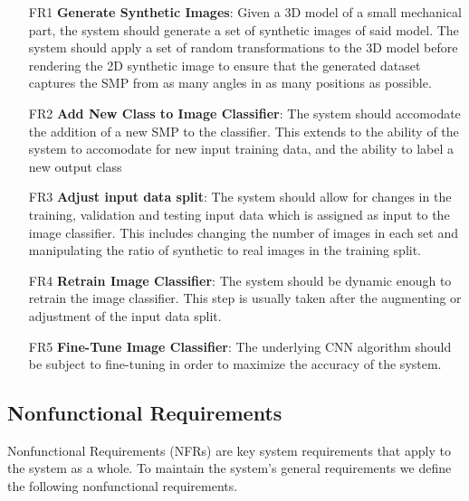 \documentclass[a4paper,12pt,twoside]{report}
\begin{document}
\begin{itemize}
\item [FR1] \textbf{Generate Synthetic Images}: Given a 3D model of a small mechanical part, the system should generate a set of synthetic images of said model. The system should apply a set of random transformations to the 3D model before rendering the 2D synthetic image to ensure that the generated dataset captures the SMP from as many angles in as many positions as possible.

\item [FR2] \textbf{Add New Class to Image Classifier}: The system should accomodate the addition of a new SMP to the classifier. This extends to the ability of the system to accomodate for new input training data, and the ability to label a new output class

\item [FR3] \textbf{Adjust input data split}: The system should allow for changes in the training, validation and testing input data which is assigned as input to the image classifier. This includes changing the number of images in each set and manipulating the ratio of synthetic to real images in the training split.

\item [FR4] \textbf{Retrain Image Classifier}: The system should be dynamic enough to retrain the image classifier. This step is usually taken after the augmenting or adjustment of the input data split.

\item [FR5] \textbf{Fine-Tune Image Classifier}: The underlying CNN algorithm should be subject to fine-tuning in order to maximize the accuracy of the system.
\end{itemize}

\subsection{Nonfunctional Requirements}

Nonfunctional Requirements (NFRs) are key system requirements that apply to the system as a whole. To maintain the system's general requirements we define the following nonfunctional requirements.
\end{document}
